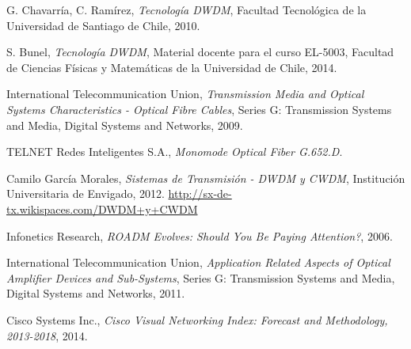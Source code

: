 
\begin{thebibliography}{9}



  G. Chavarría, C. Ramírez,
  \emph{Tecnología DWDM},
  Facultad Tecnológica de la Universidad de Santiago de Chile,
  2010.
  
  S. Bunel,
  \emph{Tecnología DWDM},
  Material docente para el curso EL-5003,
  Facultad de Ciencias Físicas y Matemáticas de la Universidad de Chile,
  2014.

  International Telecommunication Union,
  \emph{Transmission Media and Optical Systems Characteristics - Optical Fibre Cables},
  Series G: Transmission Systems and Media, Digital Systems and Networks,
  2009.

  TELNET Redes Inteligentes S.A.,
  \emph{Monomode Optical Fiber G.652.D}.
  
  Camilo Garc\'ia Morales,
  \emph{Sistemas de Transmisi\'on - DWDM y CWDM},
  Instituci\'on Universitaria de Envigado,
  2012.
  \url{http://sx-de-tx.wikispaces.com/DWDM+y+CWDM}
  
  Infonetics Research,
  \emph{ROADM Evolves: Should You Be Paying Attention?},
  2006.

  International Telecommunication Union,
  \emph{Application Related Aspects of Optical Amplifier Devices and Sub-Systems},
  Series G: Transmission Systems and Media, Digital Systems and Networks,
  2011.

  Cisco Systems Inc.,
  \emph{Cisco Visual Networking Index: Forecast and Methodology, 2013-2018},
  2014.

\end{thebibliography}